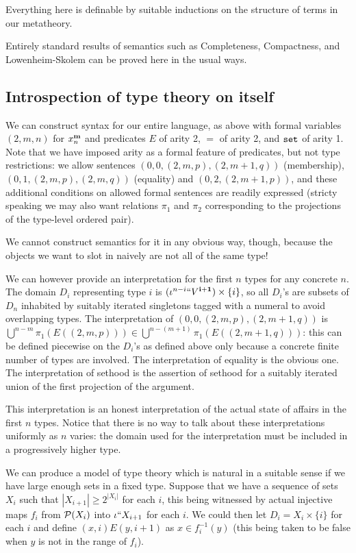 \documentclass[12pt]{article}
\begin{document}
Everything here is definable by suitable inductions on the structure of terms in our metatheory.

Entirely standard results of semantics such as Completeness, Compactness, and Lowenheim-Skolem can be proved here in the usual ways.

\subsection{Introspection of type theory on itself}

We can construct syntax for our entire language, as above with formal variables $(2,m,n)$ for $x^{\bf m}_n$ and predicates $E$ of arity 2, $=$ of arity 2, and ${\tt set}$ of arity 1.
Note that we have imposed arity as a formal feature of predicates, but not type restrictions:  we allow sentences $(0,0,(2,m,p),(2,m+1,q))$ (membership), $(0,1,(2,m,p),(2,m,q))$ (equality) and $(0,2,(2,m+1,p))$, and these additional conditions on allowed formal sentences are readily expressed (stricty speaking we may also want relations $\pi_1$ and $\pi_2$ corresponding to the projections of the type-level ordered pair).

We cannot construct semantics for it in any obvious way, though, because the objects we want to slot in naively are not all of the same type!

We can however provide an interpretation for the first $n$ types for any concrete $n$.  The domain $D_i$ representing type $i$ is $(\iota^{n-i}``V^{\bf i+1})\times \{i\}$, so all $D_i$'s are subsets
of $D_n$ inhabited by suitably iterated singletons tagged with a numeral to avoid overlapping types.  The interpretation of $(0,0,(2,m,p),(2,m+1,q))$ is
$\bigcup^{n-m}\pi_1(E((2,m,p))) \in \bigcup^{n-(m+1)}\pi_1(E((2,m+1,q)))$:  this can be defined piecewise on the $D_i$'s as defined above only because a concrete
finite number of types are involved.  The interpretation of equality is the obvious one.  The interpretation of sethood is the assertion of sethood for a suitably iterated
union of the first projection of the argument.

This interpretation is an honest interpretation of the actual state of affairs in the first $n$ types.  Notice that there is no way to talk about these interpretations uniformly as $n$ varies:  the domain used for the interpretation must be included in a progressively higher type.

We can produce a model of type theory which is natural in a suitable sense if we have large enough sets in a fixed type.  Suppose that we have a sequence of sets
$X_i$ such that $|X_{i+1}| \geq 2^{|X_i|}$ for each $i$, this being witnessed by actual injective maps $f_i$ from ${\cal P}(X_i)$ into $\iota``X_{i+1}$ for each $i$.
We could then let $D_i = X_i \times \{i\}$ for each $i$ and define $(x,i) E (y,i+1)$ as $x \in f_i^{-1}(y)$ (this being taken to be false when $y$ is not in the range of $f_i$).
\end{document}
